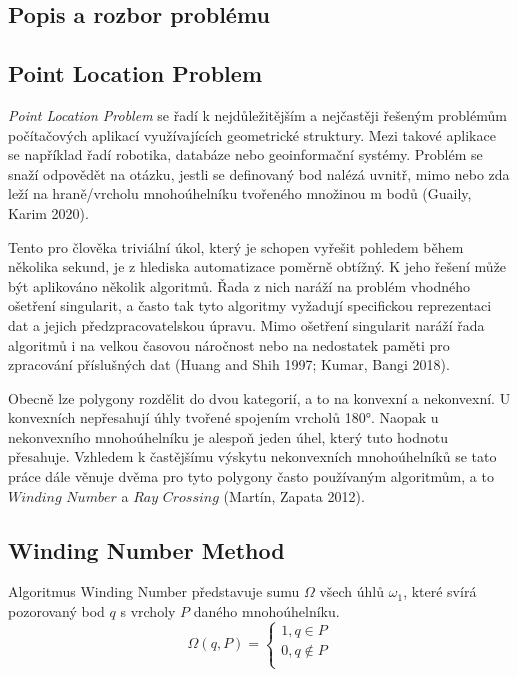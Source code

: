 \documentclass[15pt]{article}
\begin{document}
\begin{spacing}{1.5}
\newpage
\section*{Popis a rozbor problému}
\subsection*{Point Location Problem}
\textit{Point Location Problem} se řadí k nejdůležitějším a nejčastěji řešeným problémům počítačových aplikací využívajících geometrické struktury. Mezi takové aplikace se například řadí robotika, databáze nebo geoinformační systémy. Problém se snaží odpovědět na otázku, jestli se definovaný bod nalézá uvnitř, mimo nebo zda leží na hraně/vrcholu mnohoúhelníku tvořeného množinou m bodů (Guaily, Karim 2020).  

Tento pro člověka triviální úkol, který je schopen vyřešit pohledem během několika sekund, je z hlediska automatizace poměrně obtížný. K jeho řešení může být aplikováno několik algoritmů.  Řada z nich naráží na problém vhodného ošetření singularit, a často tak tyto algoritmy vyžadují specifickou reprezentaci dat a jejich předzpracovatelskou úpravu. Mimo ošetření singularit naráží řada algoritmů i na velkou časovou náročnost nebo na nedostatek paměti pro zpracování příslušných dat (Huang and Shih 1997; Kumar, Bangi 2018).  

Obecně lze polygony rozdělit do dvou kategorií, a to na konvexní a nekonvexní. U konvexních nepřesahují úhly tvořené spojením vrcholů 180°. Naopak u nekonvexního mnohoúhelníku je alespoň jeden úhel, který tuto hodnotu přesahuje. Vzhledem k častějšímu výskytu nekonvexních mnohoúhelníků se tato práce dále věnuje dvěma pro tyto polygony často používaným algoritmům, a to $Winding$ $Number$ a $Ray$ $Crossing$ (Martín, Zapata 2012).

\subsection*{Winding Number Method}
Algoritmus Winding Number představuje sumu $\Omega$ všech úhlů $\omega_1$, které svírá pozorovaný bod $q$ s vrcholy $P$ daného mnohoúhelníku. 
\begin{equation*}
\Omega (q,P)= \begin{cases}
    1, q  \in P \\
    0, q  \notin P\\
\end{cases}
\end{equation*}
 

\end{spacing}
\end{document}
